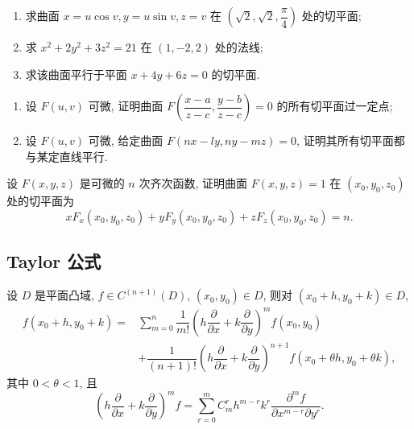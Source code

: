 \documentclass[../数学分析培优讲义.tex]{subfiles}
\begin{document}
\begin{example}
\begin{enumerate}[label=(\arabic*)]
    \item 求曲面 $x=u\cos v,y=u\sin v,z=v$ 在 $(\sqrt{2},\sqrt{2},\dfrac{\pi}{4})$ 处的切平面;
    \item 求 $x^2+2y^2+3z^2=21$ 在 $(1,-2,2)$ 处的法线;
    \item 求该曲面平行于平面 $x+4y+6z=0$ 的切平面.
\end{enumerate}
\end{example}
\exampleblank

\begin{example}
\begin{enumerate}[label=(\arabic*)]
    \item 设 $F(u,v)$ 可微, 证明曲面 $\displaystyle F\left(\dfrac{x-a}{z-c},\dfrac{y-b}{z-c}\right)=0$ 的所有切平面过一定点;
    \item 设 $F(u,v)$ 可微, 给定曲面 $F(nx-ly,ny-mz)=0$, 证明其所有切平面都与某定直线平行.
\end{enumerate}
\end{example}
\exampleblank

\begin{example}
设 $F(x,y,z)$ 是可微的 $n$ 次齐次函数, 证明曲面 $F(x,y,z)=1$ 在 $(x_0,y_0,z_0)$ 处的切平面为
\[
    xF_x(x_0,y_0,z_0)+yF_y(x_0,y_0,z_0)+zF_z(x_0,y_0,z_0)=n.
\]
\end{example}
\exampleblank


\newpage

\subsection{Taylor 公式}

\begin{theorem}
设 $D$ 是平面凸域, $f\in C^{(n+1)}(D)$, $(x_0,y_0)\in D$, 则对 $(x_0+h,y_0+k)\in D$,
\[
\begin{aligned}
    f(x_0+h,y_0+k)
    ={}&\sum\limits_{m=0}^n\dfrac{1}{m!}
    \left(h\dfrac{\partial}{\partial x}+k\dfrac{\partial}{\partial y}\right)^m f(x_0,y_0)\\
    &+\dfrac{1}{(n+1)!}
    \left(h\dfrac{\partial}{\partial x}+k\dfrac{\partial}{\partial y}\right)^{n+1}
    f(x_0+\theta h,y_0+\theta k),
\end{aligned}
\]
其中 $0<\theta<1$, 且
\[
    \left(h\dfrac{\partial}{\partial x}+k\dfrac{\partial}{\partial y}\right)^mf
    =\sum\limits_{r=0}^mC_m^r h^{m-r}k^r
    \dfrac{\partial^mf}{\partial x^{m-r}\partial y^r}.
\]
\end{theorem}
\end{document}
